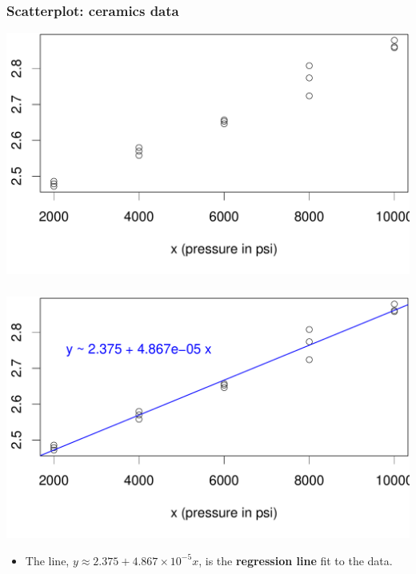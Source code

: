 \documentclass[handout]{beamer}\usepackage[]{graphicx}\usepackage[]{color}
\newenvironment{knitrout}{}{} %
\numberwithin{equation}{section}
\begin{document}
\begin{frame}[fragile]
\frametitle{\small Scatterplot: ceramics data}

\begin{center}
\begin{knitrout}
\color{fgcolor}
\includegraphics[width=.8\textwidth,height=.6\textheight]{figure/unnamed-chunk-3-1} 

\end{knitrout}
\end{center}
\end{frame}


\begin{frame}[fragile]
\frametitle{}
\begin{center}
\begin{knitrout}
\color{fgcolor}
\includegraphics[width=.8\textwidth,height=.6\textheight]{figure/unnamed-chunk-4-1} 

\end{knitrout}
\end{center}

\begin{itemize}
\item The line,  $y \approx 2.375 + 4.867 \times 10^{-5} x$, is the {\bf regression line} fit to the data.
\end{itemize}
\end{frame}
\end{document}
